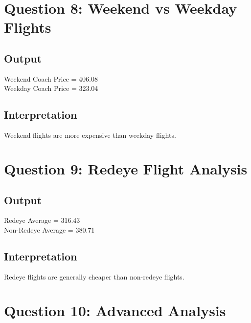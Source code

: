 \documentclass[12pt,a4paper]{article}
\begin{document}
\section{Question 8: Weekend vs Weekday Flights}

\subsection{Output}

\begin{tcolorbox}[colback=lightblue]
Weekend Coach Price = 406.08 \\
Weekday Coach Price = 323.04
\end{tcolorbox}

\subsection{Interpretation}

Weekend flights are more expensive than weekday flights.

\section{Question 9: Redeye Flight Analysis}

\subsection{Output}

\begin{tcolorbox}[colback=lightblue]
Redeye Average = 316.43 \\
Non-Redeye Average = 380.71
\end{tcolorbox}

\subsection{Interpretation}

Redeye flights are generally cheaper than non-redeye flights.

\section{Question 10: Advanced Analysis}

\end{document}
